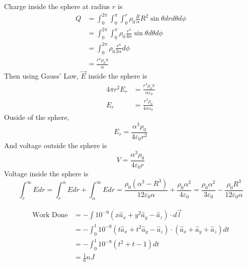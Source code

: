 \documentclass[answers]{exam}
\begin{document}
\begin{questions}
\begin{solution}
	Charge inside the sphere at radius $r$ is
	\begin{align*}
		Q &= \int_0^{2\pi} \int_0^\pi \int_0^r \rho_0\frac{R}{\alpha} R^2\sin\theta drd\theta d\phi \\
		  &= \int_0^{2\pi} \int_0^\pi \rho_0 \frac{r^4}{4\alpha} \sin\theta d\theta d\phi \\
		  &= \int_0^{2\pi} \rho_0 \frac{r^4}{2\alpha} d\phi \\
		  &= \frac{r^4\rho_0\pi}{\alpha}
	\end{align*}
	Then using Gauss' Law, $\vec{E}$ inside the sphere is
	\begin{align*}
		4\pi r^2 E_r &= \frac{r^4\rho_0\pi}{\alpha\varepsilon_0} \\
		E_r &= \frac{r^2\rho_0}{4\alpha\varepsilon_0}
	\end{align*}
	Ouside of the sphere,
	$$E_r = \frac{\alpha^3\rho_0}{4\varepsilon_0r^2}$$
	And voltage outside the sphere is
	$$V = \frac{\alpha^3\rho_0}{4\varepsilon_0r}$$
	Voltage inside the sphere is
	$$\int_r^\infty Edr = \int_r^\alpha Edr + \int_\alpha^\infty Edr = \frac{\rho_0(\alpha^3-R^3)}{12\varepsilon_0\alpha} + \frac{\rho_0\alpha^2}{4\varepsilon_0} = \frac{\rho_0\alpha^2}{3\varepsilon_0} - \frac{\rho_0R^3}{12\varepsilon_0\alpha}$$
\end{solution}


\begin{solution}
	\begin{align*}
		\text{Work Done} &= -\int 10^{-9}(x\hat{a}_x + y^2\hat{a}_y - \hat{a}_z)\cdot d\vec{l} \\
				 &= -\int_0^1 10^{-9}(t\hat{a}_x + t^2\hat{a}_y - \hat{a}_z)\cdot(\hat{a}_x + \hat{a}_y + \hat{a}_z) dt \\
				 &= -\int_0^1 10^{-9}(t^2 + t - 1)dt \\
				 &= \frac{1}{6}\unit{nJ}
	\end{align*}
\end{solution}



\end{questions}
\end{document}
